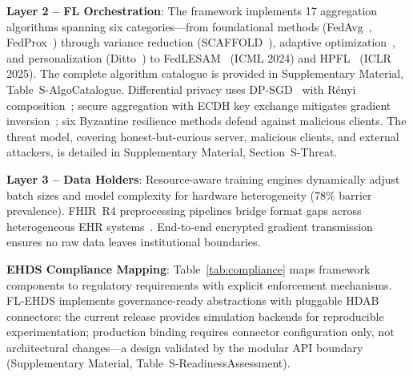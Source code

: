 \documentclass[conference]{IEEEtran}
\begin{document}
\textbf{Layer 2 -- FL Orchestration}: The framework implements 17 aggregation algorithms spanning six categories---from foundational methods (FedAvg~\cite{mcmahan2017communication}, FedProx~\cite{li2020federated}) through variance reduction (SCAFFOLD~\cite{karimireddy2020scaffold}), adaptive optimization~\cite{reddi2021adaptive}, and personalization (Ditto~\cite{li2021ditto}) to FedLESAM~\cite{qu2024fedlesam} (ICML 2024) and HPFL~\cite{chen2025hpfl} (ICLR 2025). The complete algorithm catalogue is provided in Supplementary Material, Table~S-AlgoCatalogue. Differential privacy uses DP-SGD~\cite{abadi2016deep} with R\'enyi composition~\cite{dwork2014dp, mironov2017renyi, wei2020federated}; secure aggregation with ECDH key exchange mitigates gradient inversion~\cite{zhu2019deep}; six Byzantine resilience methods defend against malicious clients. The threat model, covering honest-but-curious server, malicious clients, and external attackers, is detailed in Supplementary Material, Section~S-Threat.

\textbf{Layer 3 -- Data Holders}: Resource-aware training engines dynamically adjust batch sizes and model complexity for hardware heterogeneity (78\% barrier prevalence). FHIR~R4 preprocessing pipelines bridge format gaps across heterogeneous EHR systems~\cite{hussein2025interop}. End-to-end encrypted gradient transmission ensures no raw data leaves institutional boundaries.

\textbf{EHDS Compliance Mapping}: Table~\ref{tab:compliance} maps framework components to regulatory requirements with explicit enforcement mechanisms. FL-EHDS implements governance-ready abstractions with pluggable HDAB connectors: the current release provides simulation backends for reproducible experimentation; production binding requires connector configuration only, not architectural changes---a design validated by the modular API boundary (Supplementary Material, Table~S-ReadinessAssessment).
\end{document}
